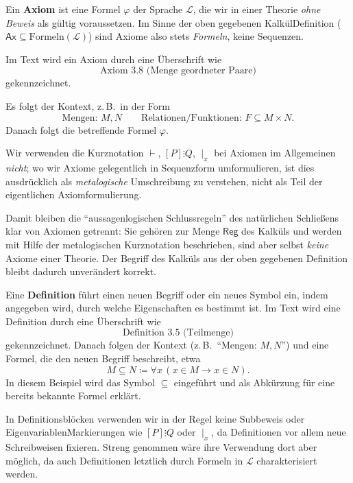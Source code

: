 \documentclass[main.tex]{subfiles}
\begin{document}
\begin{definition}[Axiom]
Ein \textbf{Axiom} ist eine Formel \(\varphi\) der Sprache
\(\mathcal L\), die wir in einer Theorie \emph{ohne Beweis} als
gültig voraussetzen. Im Sinne der oben gegebenen Kalkül\-Definition
(\(\mathsf{Ax}\subseteq \mathrm{Formeln}(\mathcal L)\)) sind Axiome
also stets \emph{Formeln}, keine Sequenzen.

Im Text wird ein Axiom durch eine Überschrift wie
\[
  \text{Axiom 3.8 (Menge geordneter Paare)}
\]
gekennzeichnet. 

Es folgt der Kontext, z.\,B.\ in der Form
\[
  \text{Mengen: } M,N
  \qquad
  \text{Relationen/Funktionen: } F \subseteq M \times N.
\]
Danach folgt die betreffende Formel \(\varphi\).

Wir verwenden die Kurznotation \(\vdash\), \([P]\vdots Q\),
\(\mid_x\) bei Axiomen im Allgemeinen \emph{nicht}; wo wir Axiome
gelegentlich in Sequenzform umformulieren, ist dies ausdrücklich
als \emph{metalogische} Umschreibung zu verstehen, nicht als Teil
der eigentlichen Axiomformulierung.
\end{definition}

\begin{remark}
Damit bleiben die \enquote{aussagenlogischen Schlussregeln} des
natürlichen Schließens klar von Axiomen getrennt: Sie gehören
zur Menge \(\mathsf{Reg}\) des Kalküls und werden mit Hilfe der
metalogischen Kurznotation beschrieben, sind aber selbst
\emph{keine} Axiome einer Theorie. Der Begriff des Kalküls aus
der oben gegebenen Definition bleibt dadurch unverändert korrekt.
\end{remark}

\begin{definition}[Definition]
Eine \textbf{Definition} führt einen neuen Begriff oder ein neues
Symbol ein, indem angegeben wird, durch welche Eigenschaften es
bestimmt ist. Im Text wird eine Definition durch eine Überschrift
wie
\[
  \text{Definition 3.5 (Teilmenge)}
\]
gekennzeichnet. Danach folgen der Kontext (z.\,B.\ \enquote{Mengen:
\(M,N\)}) und eine Formel, die den neuen Begriff beschreibt, etwa
\[
  M \subseteq N \coloneqq \forall x\,(x\in M \rightarrow x\in N).
\]
In diesem Beispiel wird das Symbol \(\subseteq\) eingeführt und
als Abkürzung für eine bereits bekannte Formel erklärt.

In Definitionsblöcken verwenden wir in der Regel keine
Subbeweis\- oder Eigenvariablen\-Markierungen wie \([P]\vdots Q\)
oder \(\mid_x\), da Definitionen vor allem neue Schreibweisen
fixieren. Streng genommen wäre ihre Verwendung dort aber möglich,
da auch Definitionen letztlich durch Formeln in \(\mathcal L\)
charakterisiert werden.
\end{definition}
\end{document}
